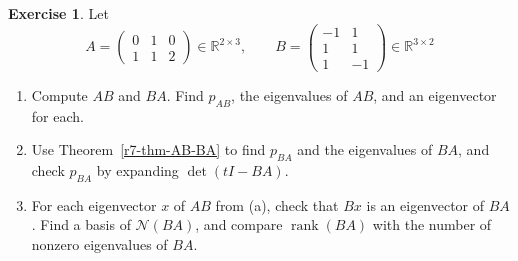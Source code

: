 \documentclass[12pt]{article}
\newcommand{\R}{\mathbb R}
\DeclareMathOperator{\rank}{rank}
\theoremstyle{definition}
\newtheorem{exercise}{Exercise}
\begin{document}
\begin{exercise}\label{r7-dr-ab-ba}
Let
\[
A=\begin{pmatrix}0&1&0\\1&1&2\end{pmatrix}\in\R^{2\times3},\qquad B=\begin{pmatrix}-1&1\\1&1\\1&-1\end{pmatrix}\in\R^{3\times2}
\]
\begin{enumerate}
\item Compute \(AB\) and \(BA\). Find \(p_{AB}\), the eigenvalues of \(AB\), and an eigenvector for each.
\item Use Theorem~\ref{r7-thm-AB-BA} to find \(p_{BA}\) and the eigenvalues of \(BA\), and check \(p_{BA}\) by expanding
\(\det(tI-BA)\).
\item For each eigenvector \(x\) of \(AB\) from (a), check that \(Bx\) is an eigenvector of \(BA\). Find a basis of
\(\mathcal N(BA)\), and compare \(\rank(BA)\) with the number of nonzero eigenvalues of \(BA\).
\end{enumerate}
\end{exercise}
\end{document}
